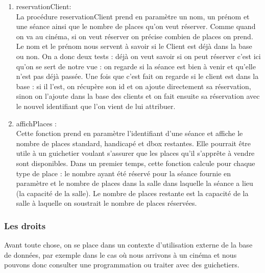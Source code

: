 \documentclass[a4paper,sffamily,12pt]{article}
\begin{document}
					\begin{enumerate}[label=\ding{228}]

						\item reservationClient: \\
						
							La procédure reservationClient prend en paramètre un nom, un prénom et une séance ainsi que le nombre de places qu'on veut réserver. Comme quand on va au cinéma, si on veut réserver on précise combien de places on prend. Le nom et le prénom nous servent à savoir si le Client est déjà dans la base ou non. On a donc deux tests : déjà on veut savoir si on peut réserver c'est ici qu'on se sert de notre vue : on regarde si la séance est bien à venir et qu'elle n'est pas déjà passée. Une fois que c'est fait on regarde si le client est dans la base : si il l'est, on récupère son id et on ajoute directement sa réservation, sinon on l'ajoute dans la base des clients et on fait ensuite sa réservation avec le nouvel identifiant que l'on vient de lui attribuer.\\
												
						\item affichPlaces : \\
						
							Cette fonction prend en paramètre l'identifiant d'une séance et affiche le nombre de places standard, handicapé et dbox restantes. Elle pourrait être utile à un guichetier voulant s'assurer que les places qu'il s'apprête à vendre sont disponibles. Dans un premier temps, cette fonction calcule pour chaque type de place : le nombre ayant été réservé pour la séance fournie en paramètre et le nombre de places dans la salle dans laquelle la séance a lieu (la capacité de la salle). Le nombre de places restante est la capacité de la salle à laquelle on soustrait le nombre de places réservées.\\
																	
					\end{enumerate}

					\newpage

				\subsubsection{Les droits}
				
					\vspace{0.5cm}
					
					Avant toute chose, on se place dans un contexte d'utilisation externe de la base de données, par exemple dans le cas où nous arrivons à un cinéma et nous pouvons donc consulter une programmation ou traiter avec des guichetiers. \\ 
\end{document}
